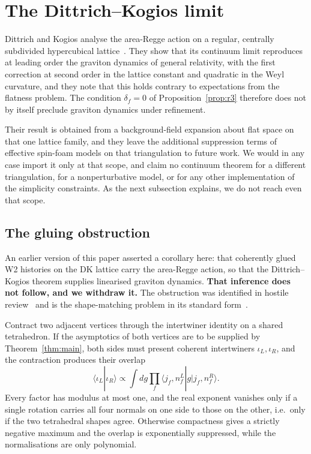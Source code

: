 \documentclass[11pt]{article}
\numberwithin{equation}{section}
\theoremstyle{definition}
\theoremstyle{remark}
\begin{document}
\section{The Dittrich--Kogios limit}\label{sec:r4}

Dittrich and Kogios analyse the area-Regge action on a regular, centrally
subdivided hypercubical lattice~\cite{DittrichKogios2023}. They show that its
continuum limit reproduces at leading order the graviton dynamics of general
relativity, with the first correction at second order in the lattice constant
and quadratic in the Weyl curvature, and they note that this holds contrary to
expectations from the flatness problem. The condition $\delta_f=0$ of
Proposition~\ref{prop:r3} therefore does not by itself preclude graviton dynamics
under refinement.

Their result is obtained from a background-field expansion about flat space on
that one lattice family, and they leave the additional suppression terms of
effective spin-foam models on that triangulation to future work. We would in any
case import it only at that scope, and claim no continuum theorem for a different
triangulation, for a nonperturbative model, or for any other implementation of
the simplicity constraints. As the next subsection explains, we do not reach even
that scope.

\subsection*{The gluing obstruction}

An earlier version of this paper asserted a corollary here: that coherently glued
W2 histories on the DK lattice carry the area-Regge action, so that the
Dittrich--Kogios theorem supplies linearised graviton dynamics. \textbf{That
inference does not follow, and we withdraw it.} The obstruction was identified in
hostile review~\cite{PR357} and is the shape-matching problem in its standard
form~\cite{DittrichSpeziale2008}.

Contract two adjacent vertices through the intertwiner identity on a shared
tetrahedron. If the asymptotics of both vertices are to be supplied by
Theorem~\ref{thm:main}, both sides must present coherent intertwiners
$\iota_L,\iota_R$, and the contraction produces their overlap
\[
\langle\iota_L|\iota_R\rangle
\propto\int dg\prod_f\langle j_f,n^L_f|g|j_f,n^R_f\rangle .
\]
Every factor has modulus at most one, and the real exponent vanishes only if a
single rotation carries all four normals on one side to those on the other, i.e.\
only if the two tetrahedral shapes agree. Otherwise compactness gives a strictly
negative maximum and the overlap is exponentially suppressed, while the
normalisations are only polynomial.
\end{document}
